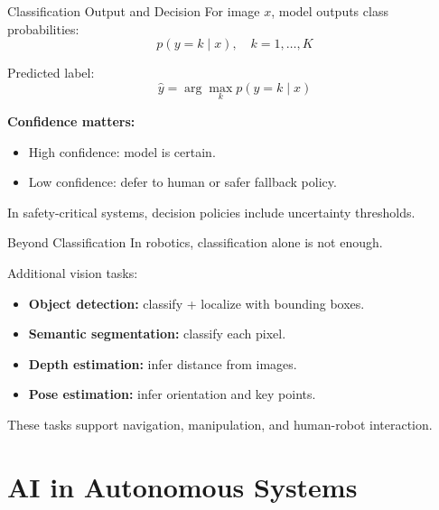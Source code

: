 \documentclass[10pt]{beamer}
\begin{document}
\begin{frame}{Classification Output and Decision}
    For image $x$, model outputs class probabilities:
    \[
      p(y=k\mid x), \quad k=1,\dots,K
    \]

    \vspace{0.2cm}
    Predicted label:
    \[
      \hat{y} = \arg\max_k p(y=k\mid x)
    \]

    \vspace{0.2cm}
    \textbf{Confidence matters:}
    \begin{itemize}
        \item High confidence: model is certain.
        \item Low confidence: defer to human or safer fallback policy.
    \end{itemize}

    \vspace{0.2cm}
    In safety-critical systems, decision policies include uncertainty thresholds.
\end{frame}

\begin{frame}{Beyond Classification}
    In robotics, classification alone is not enough.

    \vspace{0.2cm}
    Additional vision tasks:
    \begin{itemize}
        \item \textbf{Object detection:} classify + localize with bounding boxes.
        \item \textbf{Semantic segmentation:} classify each pixel.
        \item \textbf{Depth estimation:} infer distance from images.
        \item \textbf{Pose estimation:} infer orientation and key points.
    \end{itemize}

    \vspace{0.2cm}
    These tasks support navigation, manipulation, and human-robot interaction.
\end{frame}

\section{AI in Autonomous Systems}
\end{document}
